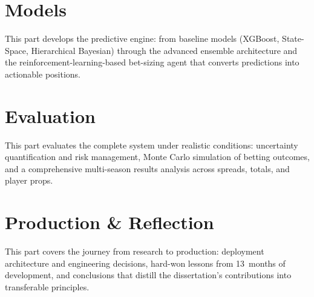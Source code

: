 \documentclass[12pt]{report}  %
\numberwithin{equation}{section}
\theoremstyle{plain}
\theoremstyle{definition}
\theoremstyle{remark}
\begin{document}
\part{Models}
\noindent This part develops the predictive engine: from baseline models (XGBoost,
State-Space, Hierarchical Bayesian) through the advanced ensemble architecture
and the reinforcement-learning-based bet-sizing agent that converts predictions
into actionable positions.





\part{Evaluation}
\noindent This part evaluates the complete system under realistic conditions:
uncertainty quantification and risk management, Monte Carlo simulation of betting
outcomes, and a comprehensive multi-season results analysis across spreads,
totals, and player props.





\part{Production \& Reflection}
\noindent This part covers the journey from research to production: deployment
architecture and engineering decisions, hard-won lessons from 13~months of
development, and conclusions that distill the dissertation's contributions
into transferable principles.





\appendix
\makeatletter
\renewcommand\thechapter{\AlphAlph{\value{chapter}}}
\makeatother
\end{document}
